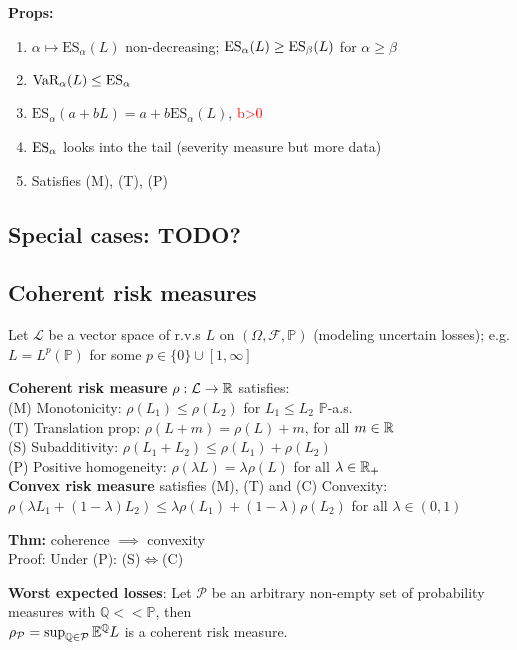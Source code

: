 \textbf{Props:}
\begin{enumerate}
    \item $\alpha\mapsto \text{ES}_\alpha(L)$ non-decreasing; $\text{ES}_\alpha(L) \geq \text{ES}_\beta(L)$ for $\alpha \geq \beta$
    \item $\text{VaR}_\alpha (L)\leq \text{ES}_\alpha$
    \item $\text{ES}_\alpha(a + bL) = a + b\text{ES}_\alpha(L)$,  \quad \textcolor{red}{b>0}
    \item $\text{ES}_\alpha$ looks into the tail (severity measure but more data)
    \item Satisfies (M), (T), (P)
\end{enumerate}

\subsection*{Special cases: TODO?}

\subsection*{Coherent risk measures}
Let $\mathcal{L}$ be a vector space of r.v.s $L$ on $(\Omega, \mathcal{F}, \mathbb{P})$
(modeling uncertain losses); e.g. $L = L^p(\mathbb{P})$ for some $p \in \{0\} \cup [1, \infty]$

\textbf{Coherent risk measure} $\rho:\mathcal{L}\rightarrow \mathbb{R}$ satisfies:\\
(M) Monotonicity: $\rho(L_1)\leq \rho(L_2)$ for $L_1\leq L_2$ $\mathbb{P}$-a.s.\\
(T) Translation prop: $\rho(L+m)=\rho(L)+m$, for all $m\in\mathbb{R}$\\
(S) Subadditivity: $\rho(L_1+L_2)\leq \rho(L_1)+\rho(L_2)$\\
(P) Positive homogeneity: $\rho(\lambda L)=\lambda \rho(L)$ for all $\lambda\in\mathbb{R}_+$\\

\textbf{Convex risk measure} satisfies (M), (T) and
(C) Convexity: $\rho(\lambda L_1 + (1-\lambda) L_2)\leq \lambda\rho( L_1) + (1-\lambda) \rho(L_2)$ for all $\lambda\in(0,1)$

\textbf{Thm:} coherence $\implies$ convexity\\
Proof: Under (P): (S)$\iff$(C)

\textbf{Worst expected losses}:
Let $\mathcal{P}$ be an arbitrary non-empty set of probability measures with $\mathbb{Q}<<\mathbb{P}$, then\\
$\rho_{\mathcal{P}} = \sup_{\mathbb{Q}\in\mathcal{P}}\mathbb{E}^{\mathbb{Q}}L$ is a coherent risk measure.

